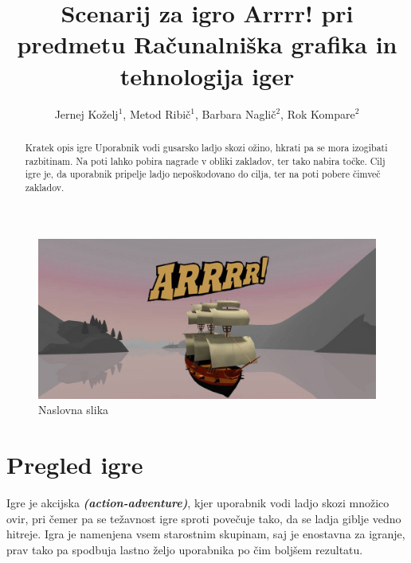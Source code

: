 \documentclass[a4paper]{article}
\begin{document}
\title{Scenarij za igro Arrrr! pri predmetu Računalniška grafika in tehnologija iger}

\author{Jernej Ko\v zelj$^{1}$, Metod Ribi\v c$^{1}$, Barbara Nagli\v c$^{2}$, Rok Kompare$^{2}$}




\maketitle


\begin{abstract}{Kratek opis igre}
Uporabnik vodi gusarsko ladjo skozi o\v zino, hkrati pa se mora izogibati razbitinam. Na poti lahko pobira nagrade v obliki zakladov, ter tako nabira to\v cke. Cilj igre je, da uporabnik pripelje ladjo nepo\v skodovano do cilja, ter na poti pobere \v cimve\v c zakladov.
\end{abstract}


\begin{figure}[!htb]
    \begin{center}
        \includegraphics[width=\columnwidth]{arrr.jpg}
        \caption{Naslovna slika} \label{fig:slika}
    \end{center}
\end{figure}




\section{Pregled igre}
Igre je akcijska \textbf{\textit{(action-adventure)}}, kjer uporabnik vodi ladjo skozi mno\v zico ovir, pri \v cemer pa se te\v zavnost igre sproti pove\v cuje tako, da se ladja giblje vedno hitreje. Igra je namenjena vsem starostnim skupinam, saj je enostavna za igranje, prav tako pa spodbuja lastno \v zeljo uporabnika po \v cim bolj\v sem rezultatu.
\end{document}
